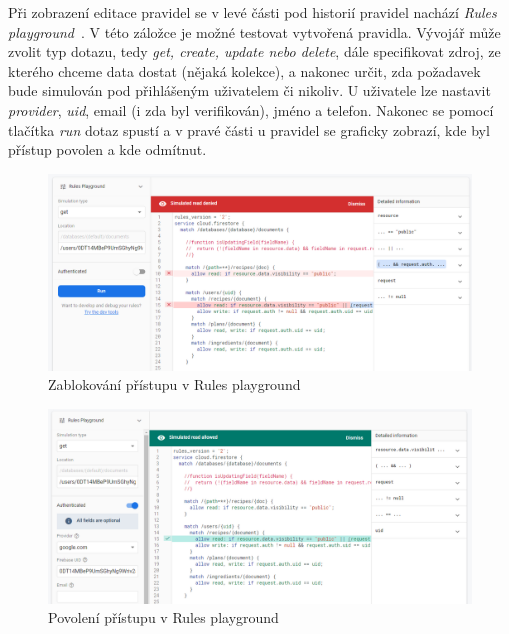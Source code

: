 Při zobrazení editace pravidel se v levé části pod historií pravidel nachází \emph{Rules playground}~\cite{FirebaseRulesPlayground}. V této záložce je možné
testovat vytvořená pravidla. Vývojář může zvolit typ dotazu, tedy \emph{get, create, update \emph{nebo} delete}, dále specifikovat
zdroj, ze kterého chceme data dostat (nějaká kolekce), a nakonec určit, zda požadavek bude simulován pod přihlášeným uživatelem
či nikoliv. U uživatele lze nastavit \emph{provider}, \emph{uid}, email (i zda byl verifikován), jméno a telefon. Nakonec se pomocí tlačítka
\emph{run} dotaz spustí a v pravé části u pravidel se graficky zobrazí, kde byl přístup povolen a kde odmítnut.


\begin{figure}[H]
    \includegraphics[width=\textwidth]{images/recipeo-rules-denied}
    \caption{Zablokování přístupu v Rules playground} \label{picture:recipeo:rules-denied}
\end{figure}

\begin{figure}[H]
    \includegraphics[width=\textwidth]{images/recipeo-rules-allowed}
    \caption{Povolení přístupu v Rules playground} \label{picture:recipeo:rules-allowed}
\end{figure}

